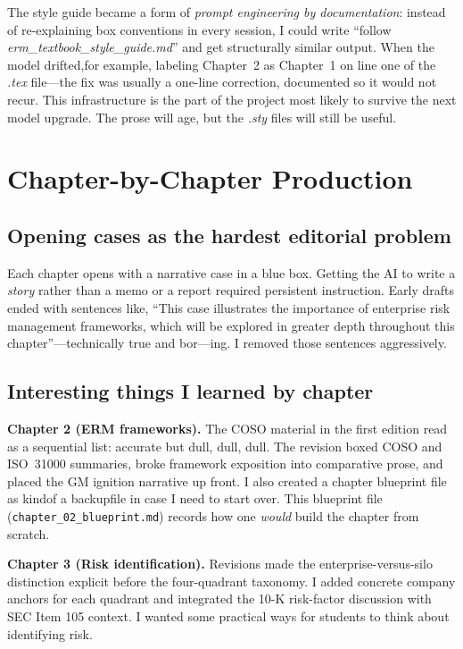 \documentclass[11pt,letterpaper]{article}
\begin{document}
The style guide became a form of \emph{prompt engineering by documentation}: instead of re-explaining box conventions in every session, I could write ``follow \textit{erm\_textbook\_style\_guide.md}'' and get structurally similar output. When the model drifted,for example, labeling Chapter~2 as Chapter~1 on line one of the \textit{.tex} file---the fix was usually a one-line correction, documented so it would not recur. This infrastructure is the part of the project most likely to survive the next model upgrade. The prose will age, but the \textit{.sty} files will still be useful.

\section{Chapter-by-Chapter Production}

\subsection{Opening cases as the hardest editorial problem}

Each chapter opens with a narrative case in a blue box. Getting the AI to write a \emph{story} rather than a memo or a report required persistent instruction. Early drafts ended with sentences like, ``This case illustrates the importance of enterprise risk management frameworks, which will be explored in greater depth throughout this chapter''---technically true and bor---ing. I removed those sentences aggressively.  

\subsection{Interesting things I learned by chapter}

\textbf{Chapter 2 (ERM frameworks).} The COSO material in the first edition read as a sequential list: accurate but dull, dull, dull. The revision boxed COSO and ISO~31000 summaries, broke framework exposition into comparative prose, and placed the GM ignition narrative up front. I also created a chapter blueprint file as kindof a backupfile in case I need to start over. This blueprint file (\texttt{chapter\_02\_blueprint.md}) records how one \emph{would} build the chapter from scratch.

\textbf{Chapter 3 (Risk identification).} Revisions made the enterprise-versus-silo distinction explicit before the four-quadrant taxonomy. I added concrete company anchors for each quadrant and integrated the 10-K risk-factor discussion with SEC Item 105 context. I wanted some practical ways for students to think about identifying risk.
\end{document}
